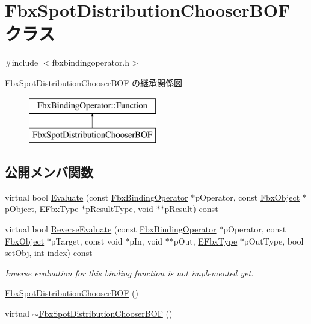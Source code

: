 \hypertarget{class_fbx_spot_distribution_chooser_b_o_f}{}\section{Fbx\+Spot\+Distribution\+Chooser\+B\+OF クラス}
\label{class_fbx_spot_distribution_chooser_b_o_f}


{\ttfamily \#include $<$fbxbindingoperator.\+h$>$}

Fbx\+Spot\+Distribution\+Chooser\+B\+OF の継承関係図\begin{figure}[H]
\begin{center}
\leavevmode
\includegraphics[height=2.000000cm]{class_fbx_spot_distribution_chooser_b_o_f}
\end{center}
\end{figure}
\subsection*{公開メンバ関数}
\begin{DoxyCompactItemize}
\item 
virtual bool \hyperlink{class_fbx_spot_distribution_chooser_b_o_f_a3372ac6ab54e4d20b6646b953f7feecf}{Evaluate} (const \hyperlink{class_fbx_binding_operator}{Fbx\+Binding\+Operator} $\ast$p\+Operator, const \hyperlink{class_fbx_object}{Fbx\+Object} $\ast$p\+Object, \hyperlink{fbxpropertytypes_8h_a73913a5ddfb20e57c6f25e9e6784bd92}{E\+Fbx\+Type} $\ast$p\+Result\+Type, void $\ast$$\ast$p\+Result) const
\item 
virtual bool \hyperlink{class_fbx_spot_distribution_chooser_b_o_f_a8442158a644f0c6c24cbcf30d86413c7}{Reverse\+Evaluate} (const \hyperlink{class_fbx_binding_operator}{Fbx\+Binding\+Operator} $\ast$p\+Operator, const \hyperlink{class_fbx_object}{Fbx\+Object} $\ast$p\+Target, const void $\ast$p\+In, void $\ast$$\ast$p\+Out, \hyperlink{fbxpropertytypes_8h_a73913a5ddfb20e57c6f25e9e6784bd92}{E\+Fbx\+Type} $\ast$p\+Out\+Type, bool set\+Obj, int index) const
\begin{DoxyCompactList}\small\item\em Inverse evaluation for this binding function is not implemented yet. \end{DoxyCompactList}\item 
\hyperlink{class_fbx_spot_distribution_chooser_b_o_f_a0a7d434d0f332221b4e8f34a7abd007e}{Fbx\+Spot\+Distribution\+Chooser\+B\+OF} ()
\item 
virtual \hyperlink{class_fbx_spot_distribution_chooser_b_o_f_a60708930467656be87365341bdec71d6}{$\sim$\+Fbx\+Spot\+Distribution\+Chooser\+B\+OF} ()
\end{DoxyCompactItemize}
